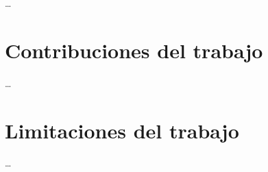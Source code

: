 \ldots

\section{Contribuciones del trabajo}
\label{sec:contribuciones}

\ldots

\section{Limitaciones del trabajo}
\label{sec:limitaciones}

\ldots

